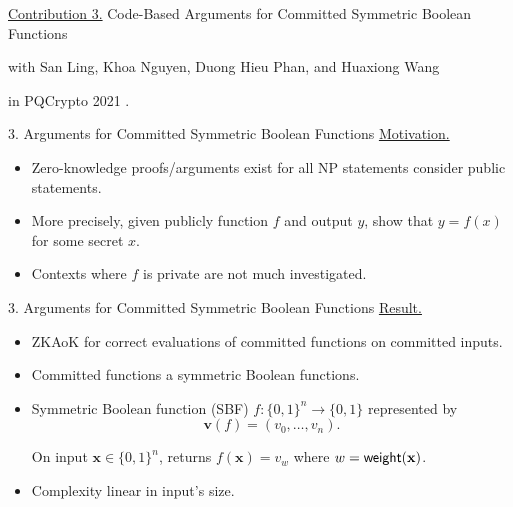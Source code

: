 \begin{frame}
	\underline{Contribution 3.} Code-Based Arguments for Committed Symmetric Boolean Functions
	
	{\small with San Ling, Khoa Nguyen, Duong Hieu Phan, and Huaxiong Wang}
	
	in PQCrypto 2021 \cite{LingNPTW21}.
\end{frame}

\begin{frame}{3. Arguments for Committed Symmetric Boolean Functions}
	\underline{Motivation.} 
	\begin{itemize}
		\item Zero-knowledge proofs/arguments exist for all NP statements consider public statements.
		\item More precisely, given publicly function $f$ and output $y$, show that $y = f(x)$ for some secret $x$.
		\item Contexts where $f$ is private are not much investigated.
	\end{itemize}
\end{frame} 
\begin{frame}{3. Arguments for Committed Symmetric Boolean Functions}
	\underline{Result.}
	\begin{itemize}
		\item ZKAoK for correct evaluations of committed functions on committed inputs.
		\item Committed functions a symmetric Boolean functions.
		\item Symmetric Boolean function (SBF) $f : \{0,1\}^n \to \{0,1\}$ represented by 
		\begin{equation*}
			\mathbf{v}(f) = (v_0, \dots, v_n).
		\end{equation*}
		
		On input $\mathbf{x} \in \{0,1\}^n$, returns $f(\mathbf{x}) = v_w$ where $w = \mathsf{weight}(\mathbf{x})$.
		\item Complexity linear in input's size.
	\end{itemize}
\end{frame}

